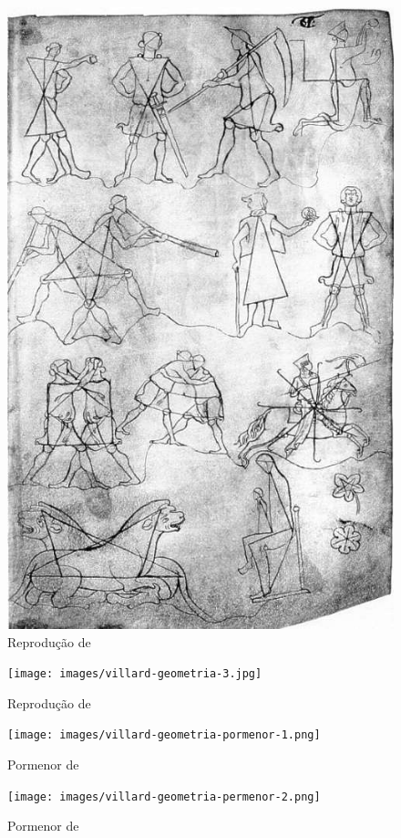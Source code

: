 \documentclass{article}
\begin{document}
\begin{figure}
  \centering\includegraphics[height=0.6\textheight,keepaspectratio]{images/villard-geometria-2.jpg}
  \caption{Reprodução de \citeauthor{villard-geometria-2}}
  \label{fig:villard-geometria-2}
\end{figure}

\begin{figure}
  \centering\texttt{[image: images/villard-geometria-3.jpg]}
  \caption{Reprodução de \citeauthor{villard-geometria-3}}
  \label{fig:villard-geometria-3}
\end{figure}

\begin{figure}
  \centering
  \begin{minipage}{0.45\textwidth}
    \centering\texttt{[image: images/villard-geometria-pormenor-1.png]}
    \caption{Pormenor de \cite{villard-geometria-1}}
  \end{minipage}
  
  \begin{minipage}{0.45\textwidth}
    \centering\texttt{[image: images/villard-geometria-permenor-2.png]}
    \caption{Pormenor de \cite{villard-geometria-2}}
  \end{minipage}
\end{figure}
\end{document}
